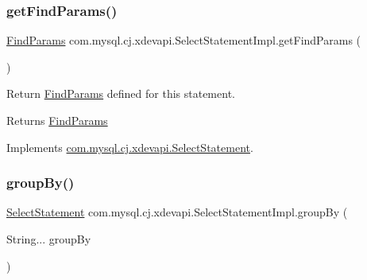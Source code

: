 \mbox{\label{classcom_1_1mysql_1_1cj_1_1xdevapi_1_1_select_statement_impl_a887ea3a5dcdb37d2bc6845cfc67631a9}} 
\subsubsection{\texorpdfstring{get\+Find\+Params()}{getFindParams()}}
{\footnotesize\ttfamily \mbox{\hyperlink{interfacecom_1_1mysql_1_1cj_1_1xdevapi_1_1_find_params}{Find\+Params}} com.\+mysql.\+cj.\+xdevapi.\+Select\+Statement\+Impl.\+get\+Find\+Params (\begin{DoxyParamCaption}{ }\end{DoxyParamCaption})}

Return \mbox{\hyperlink{interfacecom_1_1mysql_1_1cj_1_1xdevapi_1_1_find_params}{Find\+Params}} defined for this statement.

\begin{DoxyReturn}{Returns}
\mbox{\hyperlink{interfacecom_1_1mysql_1_1cj_1_1xdevapi_1_1_find_params}{Find\+Params}} 
\end{DoxyReturn}


Implements \mbox{\hyperlink{interfacecom_1_1mysql_1_1cj_1_1xdevapi_1_1_select_statement_aba9e71159f41003a6514960d37e4021b}{com.\+mysql.\+cj.\+xdevapi.\+Select\+Statement}}.

\mbox{\label{classcom_1_1mysql_1_1cj_1_1xdevapi_1_1_select_statement_impl_a88dd14474574f8e6f785aa2341b7c382}} 
\subsubsection{\texorpdfstring{group\+By()}{groupBy()}}
{\footnotesize\ttfamily \mbox{\hyperlink{interfacecom_1_1mysql_1_1cj_1_1xdevapi_1_1_select_statement}{Select\+Statement}} com.\+mysql.\+cj.\+xdevapi.\+Select\+Statement\+Impl.\+group\+By (\begin{DoxyParamCaption}\item[{String...}]{group\+By }\end{DoxyParamCaption})}

